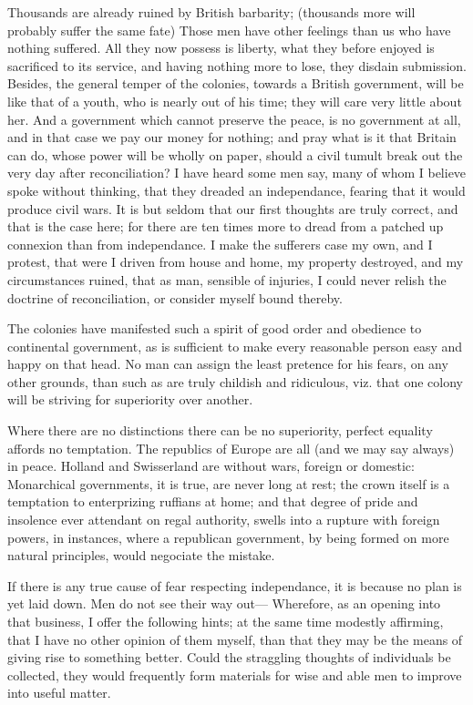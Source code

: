 \documentclass[12pt,oneside]{memoir}
\begin{document}
Thousands are already ruined by British barbarity; (thousands more
will probably suffer the same fate) Those men have other feelings
than us who have nothing suffered. All they now possess is liberty,
what they before enjoyed is sacrificed to its service, and having
nothing more to lose, they disdain submission. Besides, the general
temper of the colonies, towards a British government, will be like
that of a youth, who is nearly out of his time; they will care very
little about her. And a government which cannot preserve the peace,
is no government at all, and in that case we pay our money for
nothing; and pray what is it that Britain can do, whose power will
be wholly on paper, should a civil tumult break out the very day
after reconciliation? I have heard some men say, many of whom I
believe spoke without thinking, that they dreaded an independance,
fearing that it would produce civil wars. It is but seldom that our
first thoughts are truly correct, and that is the case here; for
there are ten times more to dread from a patched up connexion than 
from independance. I make the sufferers case my own, and I protest,
that were I driven from house and home, my property destroyed, and
my circumstances ruined, that as man, sensible of injuries, I could
never relish the doctrine of reconciliation, or consider myself
bound thereby.

The colonies have manifested such a spirit of good order and
obedience to continental government, as is sufficient to make every
reasonable person easy and happy on that head. No man can assign the
least pretence for his fears, on any other grounds, than such as are
truly childish and ridiculous, viz. that one colony will be striving
for superiority over another.

Where there are no distinctions there can be no superiority, perfect
equality affords no temptation. The republics of Europe are all (and
we may say always) in peace. Holland and Swisserland are without
wars, foreign or domestic: Monarchical governments, it is true, are
never long at rest; the crown itself is a temptation to enterprizing
ruffians at home; and that degree of pride and insolence ever
attendant on regal authority, swells into a rupture with foreign
powers, in instances, where a republican government, by being formed
on more natural principles, would negociate the mistake.

If there is any true cause of fear respecting independance, it is
because no plan is yet laid down. Men do not see their way out---
Wherefore, as an opening into that business, I offer the following
hints; at the same time modestly affirming, that I have no other
opinion of them myself, than that they may be the means of giving
rise to something better. Could the straggling thoughts of
individuals be collected, they would frequently form materials for
wise and able men to improve into useful matter.
\end{document}
